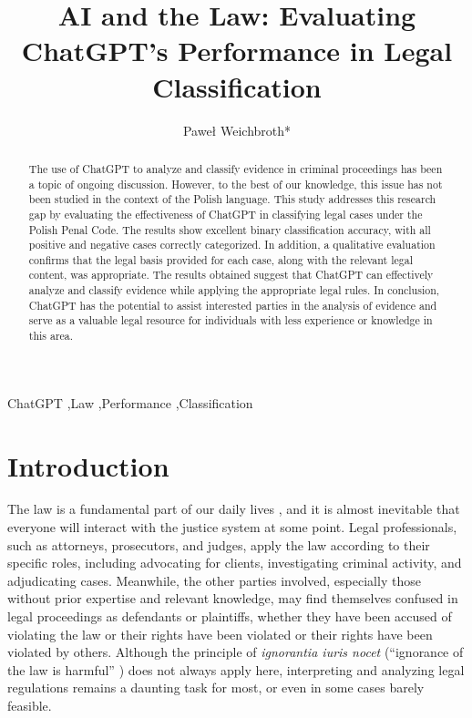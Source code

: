 \documentclass[preprint,12pt,number]{elsarticle}
\begin{document}
\begin{frontmatter}

\title{AI and the Law: Evaluating ChatGPT's Performance in Legal Classification}

\author[inst1]{Paweł Weichbroth*}

\begin{abstract}
The use of ChatGPT to analyze and classify evidence in criminal proceedings has been a topic of ongoing discussion. However, to the best of our knowledge, this issue has not been studied in the context of the Polish language. This study addresses this research gap by evaluating the effectiveness of ChatGPT in classifying legal cases under the Polish Penal Code. The results show excellent binary classification accuracy, with all positive and negative cases correctly categorized. In addition, a qualitative evaluation confirms that the legal basis provided for each case, along with the relevant legal content, was appropriate. The results obtained suggest that ChatGPT can effectively analyze and classify evidence while applying the appropriate legal rules. In conclusion, ChatGPT has the potential to assist interested parties in the analysis of evidence and serve as a valuable legal resource for individuals with less experience or knowledge in this area.
\end{abstract}

\begin{keyword}
ChatGPT \sep Law \sep Performance \sep Classification
\end{keyword}

\end{frontmatter}

\section{Introduction}
\label{sec:introduction}
The law is a fundamental part of our daily lives \cite{galligan2006law}, and it is almost inevitable that everyone will interact with the justice system at some point. Legal professionals, such as attorneys, prosecutors, and judges, apply the law according to their specific roles, including advocating for clients, investigating criminal activity, and adjudicating cases. 
Meanwhile, the other parties involved, especially those without prior expertise and relevant knowledge, may find themselves confused in legal proceedings as defendants or plaintiffs, whether they have been accused of violating the law or their rights have been violated or their rights have been violated by others. Although the principle of \textit{ignorantia iuris nocet} (``ignorance of the law is harmful'' \cite{szylkowska2019ignorantia}) does not always apply here, interpreting and analyzing legal regulations remains a daunting task for most, or even in some cases barely feasible.
\end{document}

